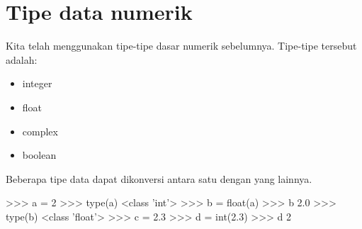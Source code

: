 \section{Tipe data numerik}

Kita telah menggunakan tipe-tipe dasar numerik sebelumnya.
Tipe-tipe tersebut adalah:
\begin{itemize}
\item integer
\item float
\item complex
\item boolean
\end{itemize}

Beberapa tipe data dapat dikonversi antara satu dengan yang lainnya.
\begin{pyconcode}
>>> a = 2
>>> type(a)
<class 'int'>
>>> b = float(a)
>>> b
2.0
>>> type(b)
<class 'float'>
>>> c = 2.3
>>> d = int(2.3)
>>> d
2
\end{pyconcode}